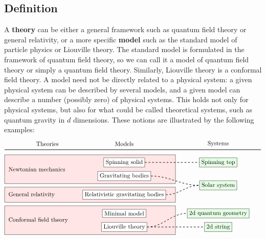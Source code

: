 \documentclass[12pt, a4paper, notitlepage, twoside]{report}
\numberwithin{equation}{section}
\theoremstyle{break}
\begin{document}
\subsection{Definition} 

A \textbf{\boldmath theory} can be either a general framework such as quantum field theory or general relativity, or a more specific \textbf{\boldmath model} such as the standard model of particle physics or Liouville theory.
The standard model is formulated in the framework of quantum field theory, so we can call it a model of quantum field theory or simply a quantum field theory.
Similarly, Liouville theory is a conformal field theory.
A model need not be directly related to a physical system: a given physical system can be described by several models, and a given model can describe a number (possibly zero) of physical systems.
This holds not only for physical systems, but also for what could be called theoretical systems, such as quantum gravity in $d$ dimensions.
These notions are illustrated by the following examples:
\begin{align}
 \begin{tikzpicture}[scale = .5]
  \node at (5,11){Theories};
  \node at (14,11){Models};
  \node at (25,11){Systems};
  \draw[thick] (0,10.3) -- (30,10.3);
  \draw[fill = red!10] (0, 6.3) rectangle (20, 9.7);
  \draw[fill = red!10] (0, 4.1) rectangle (20, 5.9);
  \draw[fill = red!10] (0, .3) rectangle (20, 3.7);
  \node at (.2, 8)[right] {Newtonian mechanics};
  \node at (.2, 5)[right] {General relativity};
  \node at (.2, 2)[right] {Conformal field theory};
  \draw (14, 8.8) node[draw, fill = white] (ss) {Spinning solid};
  \draw (14, 7.2) node[draw, fill = white] (gb) {Gravitating bodies};
  \draw (14, 5) node[draw, fill = white] (rgb) {Relativistic gravitating bodies};
  \draw (14, 2.8) node[draw, fill = white] (mm) {Minimal model};
  \draw (14, 1.2) node[draw, fill = white] (lt) {Liouville theory};
  \draw (25, 8.8) node[draw, fill = green!10] (st) {Spinning top};
  \draw (25, 6.1) node[draw, fill = green!10] (ssys) {Solar system};
  \draw (25, 2.8) node[draw, fill = green!10] (qg) {2d quantum geometry};
  \draw (25, 1.2) node[draw, fill = green!10] (str) {2d string};
  \draw[thick, dashed] (ss.east) to [out = 0, in = 180] (st.west);
  \draw[thick, dashed] (gb.east) to [out = 0, in = 180] (ssys.west);
  \draw[thick, dashed] (rgb.east) to [out = 0, in = 180] (ssys.west);
  \draw[thick, dashed] (lt.east) to [out = 0, in = 180] (qg.west);
  \draw[thick, dashed] (lt.east) to [out = 0, in = 180] (str.west);
 \end{tikzpicture}
\end{align}
\end{document}
